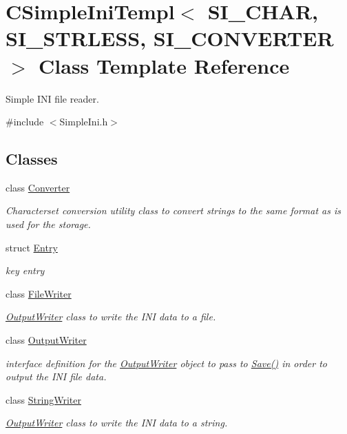 \hypertarget{class_c_simple_ini_templ}{}\section{C\+Simple\+Ini\+Templ$<$ S\+I\+\_\+\+C\+H\+AR, S\+I\+\_\+\+S\+T\+R\+L\+E\+SS, S\+I\+\_\+\+C\+O\+N\+V\+E\+R\+T\+ER $>$ Class Template Reference}
\label{class_c_simple_ini_templ}


Simple I\+NI file reader.  




{\ttfamily \#include $<$Simple\+Ini.\+h$>$}

\subsection*{Classes}
\begin{DoxyCompactItemize}
\item 
class \hyperlink{class_c_simple_ini_templ_1_1_converter}{Converter}
\begin{DoxyCompactList}\small\item\em Characterset conversion utility class to convert strings to the same format as is used for the storage. \end{DoxyCompactList}\item 
struct \hyperlink{struct_c_simple_ini_templ_1_1_entry}{Entry}
\begin{DoxyCompactList}\small\item\em key entry \end{DoxyCompactList}\item 
class \hyperlink{class_c_simple_ini_templ_1_1_file_writer}{File\+Writer}
\begin{DoxyCompactList}\small\item\em \hyperlink{class_c_simple_ini_templ_1_1_output_writer}{Output\+Writer} class to write the I\+NI data to a file. \end{DoxyCompactList}\item 
class \hyperlink{class_c_simple_ini_templ_1_1_output_writer}{Output\+Writer}
\begin{DoxyCompactList}\small\item\em interface definition for the \hyperlink{class_c_simple_ini_templ_1_1_output_writer}{Output\+Writer} object to pass to \hyperlink{class_c_simple_ini_templ_a5fea5d590edbb5eef694991c7c355915}{Save()} in order to output the I\+NI file data. \end{DoxyCompactList}\item 
class \hyperlink{class_c_simple_ini_templ_1_1_string_writer}{String\+Writer}
\begin{DoxyCompactList}\small\item\em \hyperlink{class_c_simple_ini_templ_1_1_output_writer}{Output\+Writer} class to write the I\+NI data to a string. \end{DoxyCompactList}\end{DoxyCompactItemize}
